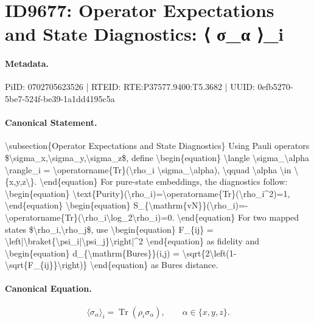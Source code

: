 \section*{ID9677: Operator Expectations and State Diagnostics: ⟨ σ\_α ⟩\_i}
\paragraph{Metadata.}
PiID: 0702705623526 | RTEID: RTE:P37577.9400:T5.3682 | UUID: 0efb5270-5be7-524f-be39-1a1dd4195c5a

\paragraph{Canonical Statement.}
\textbackslash{}subsection\{Operator Expectations and State Diagnostics\} Using Pauli operators \$\textbackslash{}sigma\_x,\textbackslash{}sigma\_y,\textbackslash{}sigma\_z\$, define \textbackslash{}begin\{equation\} \textbackslash{}langle \textbackslash{}sigma\_\textbackslash{}alpha \textbackslash{}rangle\_i = \textbackslash{}operatorname\{Tr\}(\textbackslash{}rho\_i \textbackslash{}sigma\_\textbackslash{}alpha), \textbackslash{}qquad \textbackslash{}alpha \textbackslash{}in \textbackslash{}\{x,y,z\textbackslash{}\}. \textbackslash{}end\{equation\} For pure-state embeddings, the diagnostics follow: \textbackslash{}begin\{equation\} \textbackslash{}text\{Purity\}(\textbackslash{}rho\_i)=\textbackslash{}operatorname\{Tr\}(\textbackslash{}rho\_i\textasciicircum{}2)=1, \textbackslash{}end\{equation\} \textbackslash{}begin\{equation\} S\_\{\textbackslash{}mathrm\{vN\}\}(\textbackslash{}rho\_i)=-\textbackslash{}operatorname\{Tr\}(\textbackslash{}rho\_i\textbackslash{}log\_2\textbackslash{}rho\_i)=0. \textbackslash{}end\{equation\} For two mapped states \$\textbackslash{}rho\_i,\textbackslash{}rho\_j\$, use \textbackslash{}begin\{equation\} F\_\{ij\} = \textbackslash{}left|\textbackslash{}braket\{\textbackslash{}psi\_i|\textbackslash{}psi\_j\}\textbackslash{}right|\textasciicircum{}2 \textbackslash{}end\{equation\} as fidelity and \textbackslash{}begin\{equation\} d\_\{\textbackslash{}mathrm\{Bures\}\}(i,j) = \textbackslash{}sqrt\{2\textbackslash{}left(1-\textbackslash{}sqrt\{F\_\{ij\}\}\textbackslash{}right)\} \textbackslash{}end\{equation\} as Bures distance.

\paragraph{Canonical Equation.}
\[
\langle \sigma_\alpha \rangle_i = \operatorname{Tr}(\rho_i \sigma_\alpha), \qquad \alpha \in \{x,y,z\}.
\]

